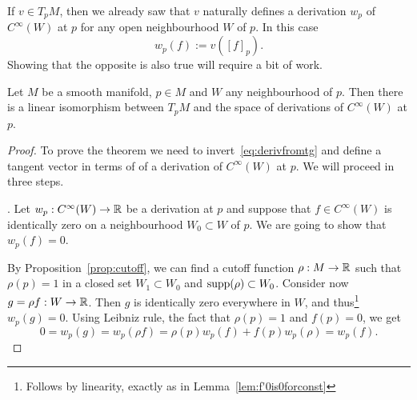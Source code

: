 If $v\in T_p M$, then we already saw that $v$ naturally defines a derivation $w_p$ of $C^\infty(W)$ at $p$ for any open neighbourhood $W$ of $p$.
In this case
\begin{equation}\label{eq:derivfromtg}
  w_p(f) := v([f]_p).
\end{equation}
Showing that the opposite is also true will require a bit of work.

\begin{proposition}
  Let $M$ be a smooth manifold, $p\in M$ and $W$ any neighbourhood of $p$.
  Then there is a linear isomorphism between $T_p M$ and the space of derivations of $C^\infty(W)$ at $p$.
\end{proposition}
\begin{proof}
  To prove the theorem we need to invert~\eqref{eq:derivfromtg} and define a tangent vector in terms of of a derivation of $C^\infty(W)$ at $p$.
  We will proceed in three steps.

  . Let $w_p:C^\infty(W) \to\mathbb{R}$ be a derivation at $p$ and suppose that $f\in C^\infty(W)$ is identically zero on a neighbourhood $W_0\subset W$ of $p$.
  We are going to show that $w_p(f)=0$.

  By Proposition~\ref{prop:cutoff}, we can find a cutoff function $\rho:M\to\mathbb{R}$ such that $\rho(p)=1$ in a closed set $W_1 \subset W_0$ and $\operatorname{supp}(\rho) \subset W_0$. Consider now $g = \rho f : W \to \mathbb{R}$.
  Then $g$ is identically zero everywhere in $W$, and thus\footnote{Follows by linearity, exactly as in Lemma~\ref{lem:f'0is0forconst}} $w_p(g) = 0$.
  Using Leibniz rule, the fact that $\rho(p)=1$ and $f(p) = 0$, we get
  \begin{equation}
    0 = w_p(g) = w_p(\rho f) = \rho(p) w_p(f) + f(p)w_p(\rho) = w_p(f).
  \end{equation}


\end{proof}
